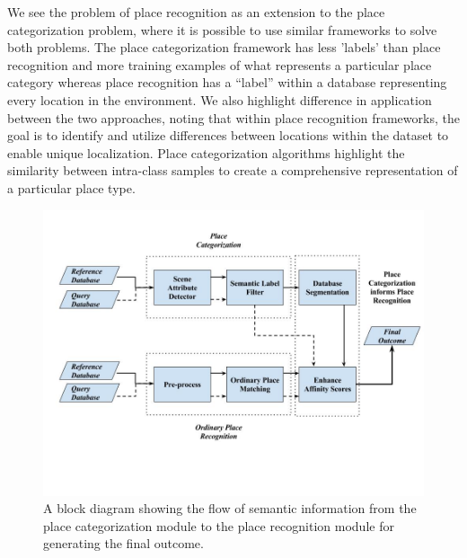 \documentclass[letterpaper, 10 pt, conference]{ieeeconf}  %
\begin{document}
We see the problem of place recognition as an extension to the place categorization problem, where it is possible to use similar frameworks to solve both problems. The place categorization framework has less 'labels' than place recognition and more training examples of what represents a particular place category whereas place recognition has a ``label'' within a database representing every location in the environment. We also highlight difference in application between the two approaches, noting that within place recognition frameworks, the goal is to identify and utilize differences between locations within the dataset to enable unique localization. Place categorization algorithms highlight the similarity between intra-class samples to create a comprehensive representation of a particular place type. 

\begin{figure}
	\includegraphics[clip, trim=1cm 5cm 0cm 2cm,scale=0.27]{flowchart}
	\caption{A block diagram showing the flow of semantic information from the place categorization module to the place recognition module for generating the final outcome.}
	\label{fig:flowchart}
\end{figure}
\end{document}
